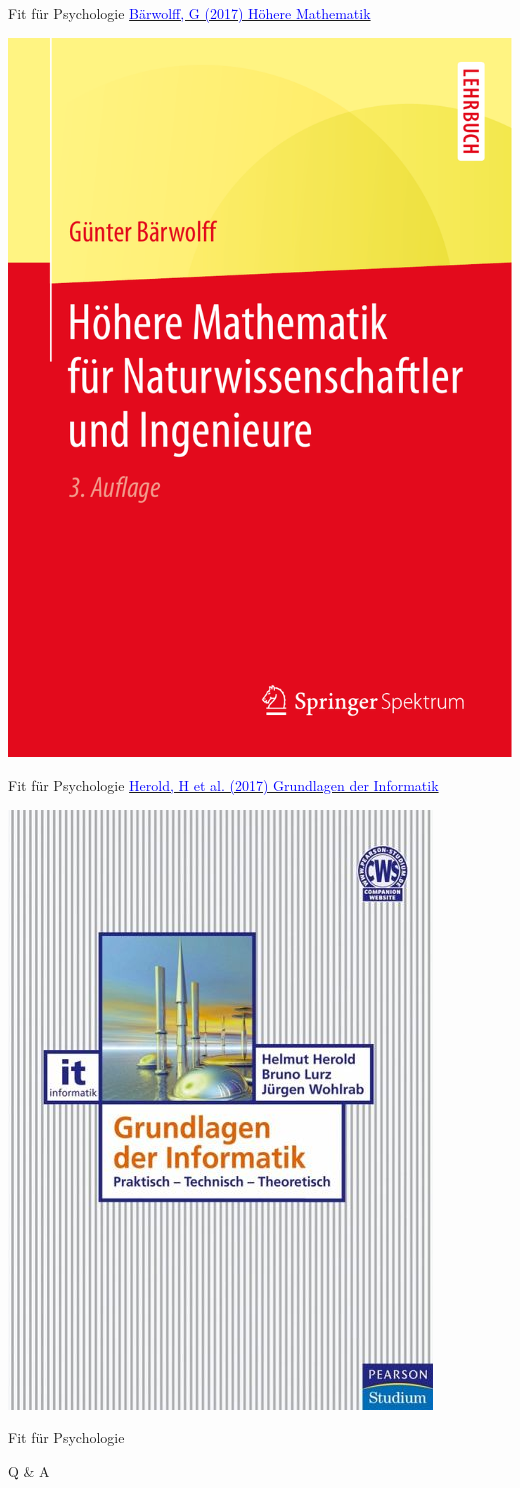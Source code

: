 \documentclass[
  8pt,
  ignorenonframetext,
]{beamer}
\begin{document}
\begin{frame}[t]{Fit für Psychologie}
\protect\hypertarget{fit-fuxfcr-psychologie-3}{}
\href{https://www.springer.com/de/book/9783662550212}{\textcolor{blue}{Bärwolff, G (2017) Höhere Mathematik}}

\vspace{5mm}

\begin{center}\includegraphics[width=0.35\linewidth]{../Abbildungen/glmi_0_baerwolff} \end{center}
\end{frame}

\begin{frame}[t]{Fit für Psychologie}
\protect\hypertarget{fit-fuxfcr-psychologie-4}{}
\href{https://www.pearson.de/grundlagen-der-informatik-9783863268039}{\textcolor{blue}{Herold, H et al. (2017) Grundlagen der Informatik}}

\vspace{5mm}

\begin{center}\includegraphics[width=0.35\linewidth]{../Abbildungen/glmi_0_herold} \end{center}
\end{frame}

\begin{frame}{Fit für Psychologie}
\protect\hypertarget{fit-fuxfcr-psychologie-5}{}
\Huge
\vfill
\center

Q \& A \vfill
\end{frame}
\end{document}

